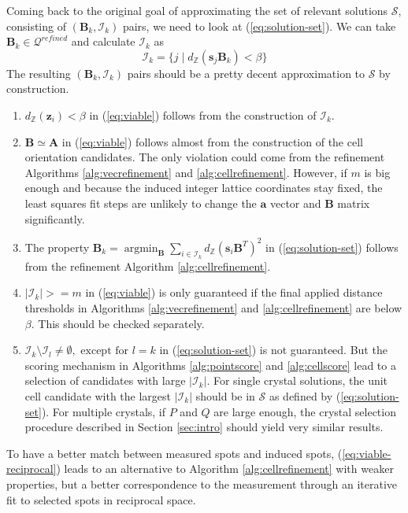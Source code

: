 \documentclass[a4paper,10pt]{article}
\DeclareMathOperator*{\argmin}{argmin}
\newcommand{\vect}[1]{\mathbf{#1}}
\newcommand{\mat}[1]{\mathbf{#1}}
\newcommand{\distZ}[1]{d_\mathbb{Z}(#1)}
\begin{document}
Coming back to the original goal of approximating the set of relevant solutions $\mathcal{S}$, consisting of $(\mat{B}_k, \mathcal{I}_k)$ pairs, we need to look at (\ref{eq:solution-set}). We can take $\mat{B}_k\in \mathcal{Q}^{refined}$ and calculate $\mathcal{I}_k$ as
%
\[
 \mathcal{I}_k = \{ j \mid \distZ{\vect{s}_j\mat{B}_k} < \beta \}
\]
%
The resulting $(\mat{B}_k, \mathcal{I}_k)$ pairs should be a pretty decent approximation to $\mathcal{S}$ by construction.
%
\begin{enumerate}
 \item $\distZ{\vect{z}_i} < \beta$ in (\ref{eq:viable}) follows from the construction of $\mathcal{I}_k$.
 \item $\mat{B} \simeq \mat{A}$ in (\ref{eq:viable}) follows almost from the construction of the cell orientation candidates. The only violation could come from the refinement Algorithms \ref{alg:vecrefinement} and \ref{alg:cellrefinement}. However, if $m$ is big enough and because the induced integer lattice coordinates stay fixed, the least squares fit steps are unlikely to change the $\vect{a}$ vector and $\mat{B}$ matrix significantly.
 \item The property $\mat{B}_k = \argmin_{\mat{B}} \sum_{i\in \mathcal{I}_k} \distZ{\vect{s}_i\mat{B}^T}^2$ in (\ref{eq:solution-set}) follows from the refinement Algorithm \ref{alg:cellrefinement}.
 \item $|\mathcal{I}_k| >= m$ in (\ref{eq:viable}) is only guaranteed if the final applied distance thresholds in Algorithms \ref{alg:vecrefinement} and \ref{alg:cellrefinement} are below $\beta$. This should be checked separately.
 \item $\mathcal{I}_k \setminus \mathcal{I}_l \neq \emptyset,\text{ except for }l=k$ in (\ref{eq:solution-set}) is not guaranteed. But the scoring mechanism in Algorithms \ref{alg:pointscore} and \ref{alg:cellscore} lead to a selection of candidates with large $|\mathcal{I}_k|$. For single crystal solutions, the unit cell candidate with the largest $|\mathcal{I}_k|$ should be in $\mathcal{S}$ as defined by (\ref{eq:solution-set}). For multiple crystals, if $P$ and $Q$ are large enough, the crystal selection procedure described in Section \ref{sec:intro} should yield very similar results.
\end{enumerate}
%
To have a better match between measured spots and induced spots, (\ref{eq:viable-reciprocal}) leads to an alternative to Algorithm \ref{alg:cellrefinement} with weaker properties, but a better correspondence to the measurement through an iterative fit to selected spots in reciprocal space.
\end{document}
